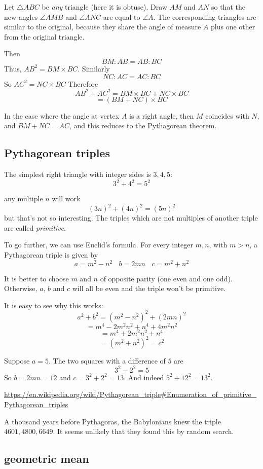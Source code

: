 \documentclass[11pt, oneside]{article}
\begin{document}
Let $\triangle ABC$ be \emph{any} triangle (here it is obtuse).  Draw $AM$ and $AN$ so that the new angles $\angle AMB$ and $\angle ANC$ are equal to $\angle A$.  The corresponding triangles are similar to the original, because they share the angle of measure $A$ plus one other from the original triangle.

Then
\[ BM:AB = AB:BC \]
Thus, $AB^2 = BM \times BC$.  Similarly
\[ NC:AC = AC:BC  \]
So $AC^2 = NC \times BC$
Therefore
\[ AB^2 + AC^2 = BM \times BC + NC \times BC \]
\[ = (BM + NC) \times BC \]

In the case where the angle at vertex $A$ is a right angle, then $M$ coincides with $N$, and $BM + NC = AC$, and this reduces to the Pythagorean theorem.

\subsection*{Pythagorean triples}
The simplest right triangle with integer sides is $3,4,5$:
\[ 3^2 + 4^2 = 5^2 \]

any multiple $n$ will work
\[ (3n)^2 + (4n)^2 = (5n)^2 \]
but that's not so interesting.  The triples which are not multiples of another triple are called \emph{primitive}.

To go further, we can use Euclid's formula.  For every integer $m,n$, with $m > n$, a Pythagorean triple is given by
\[ a = m^2 - n^2 \ \ \ \ b = 2mn \ \ \ \ c = m^2 + n^2 \]

It is better to choose $m$ and $n$ of opposite parity (one even and one odd).  Otherwise, $a$, $b$ and $c$ will all be even and the triple won't  be primitive.

It is easy to see why this works:
\[ a^2 + b^2 = (m^2 - n^2)^2 + (2mn)^2 \]
\[ = m^4 - 2m^2n^2 + n^4 + 4m^2n^2 \]
\[ = m^4 + 2m^2n^2 + n^4 \]
\[ = (m^2 + n^2)^2 = c^2 \]

Suppose $a = 5$.  The two squares with a difference of $5$ are 
\[ 3^2 - 2^2 = 5 \]
So $b = 2mn = 12$ and $c = 3^2 + 2^2 = 13$.  And indeed $5^2 + 12^2 = 13^2$.

\url{https://en.wikipedia.org/wiki/Pythagorean_triple#Enumeration_of_primitive_Pythagorean_triples}

A thousand years before Pythagoras, the Babylonians knew the triple $4601,4800,6649$.  It seems unlikely that they found this by random search.

\subsection*{geometric mean}
\end{document}
